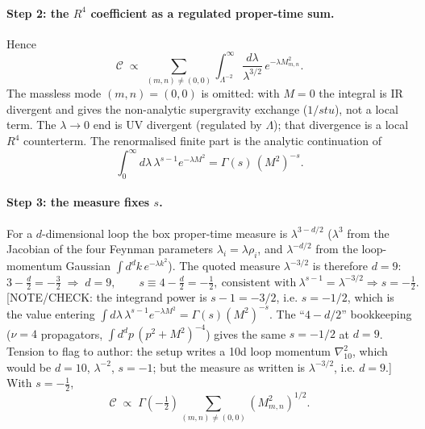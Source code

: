 \paragraph{Step 2: the $R^4$ coefficient as a regulated proper-time sum.}
Hence
\begin{equation}
\mathcal{C} \;\propto\; \sum_{(m,n)\neq(0,0)} \int_{\Lambda^{-2}}^\infty \frac{d\lambda}{\lambda^{3/2}}\, e^{-\lambda M_{m,n}^2}.
\end{equation}
The massless mode $(m,n)=(0,0)$ is omitted: with $M=0$ the integral is IR divergent and gives the
non-analytic supergravity exchange ($1/stu$), not a local term.
The $\lambda\to0$ end is UV divergent (regulated by $\Lambda$); that divergence is a local $R^4$
counterterm. The renormalised finite part is the analytic continuation of
\begin{equation}
\int_0^\infty d\lambda\, \lambda^{s-1} e^{-\lambda M^2} = \Gamma(s)\,(M^2)^{-s}.
\end{equation}

\paragraph{Step 3: the measure fixes $s$.}
For a $d$-dimensional loop the box proper-time measure is $\lambda^{3-d/2}$
($\lambda^3$ from the Jacobian of the four Feynman parameters $\lambda_i=\lambda\rho_i$, and
$\lambda^{-d/2}$ from the loop-momentum Gaussian $\int d^dk\,e^{-\lambda k^2}$).
The quoted measure $\lambda^{-3/2}$ is therefore $d=9$:
\begin{equation}
3-\tfrac{d}{2} = -\tfrac32 \;\Rightarrow\; d=9,\qquad
s \equiv 4-\tfrac{d}{2} = -\tfrac12,\ \text{consistent with}\ \lambda^{s-1}=\lambda^{-3/2}\Rightarrow s=-\tfrac12 .
\end{equation}
[NOTE/CHECK: the integrand power is $s-1 = -3/2$, i.e. $s=-1/2$, which is the value entering
$\int d\lambda\,\lambda^{s-1}e^{-\lambda M^2}=\Gamma(s)(M^2)^{-s}$. The ``$4-d/2$'' bookkeeping
($\nu=4$ propagators, $\int d^dp\,(p^2+M^2)^{-4}$) gives the same $s=-1/2$ at $d=9$. Tension to flag
to author: the setup writes a 10d loop momentum $\nabla^2_{10}$, which would be $d=10$,
$\lambda^{-2}$, $s=-1$; but the measure as written is $\lambda^{-3/2}$, i.e. $d=9$.]
With $s=-\tfrac12$,
\begin{equation}
\mathcal{C} \;\propto\; \Gamma\!\left(-\tfrac12\right)\sum_{(m,n)\neq(0,0)} (M_{m,n}^2)^{1/2}.
\end{equation}

